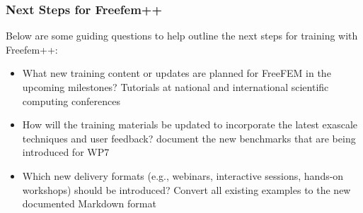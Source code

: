 \subsubsection{Next Steps for Freefem++}
\label{sec:Freefem++:next-steps}

Below are some guiding questions to help outline the next steps for training with Freefem++:
\begin{itemize}
    \item What new training content or updates are planned for FreeFEM in the upcoming milestones? Tutorials at national and international scientific computing conferences
    \item How will the training materials be updated to incorporate the latest exascale techniques and user feedback? document the new benchmarks that are being introduced for WP7
    \item Which new delivery formats (e.g., webinars, interactive sessions, hands-on workshops) should be introduced? Convert all existing examples to the new documented Markdown format
\end{itemize}
